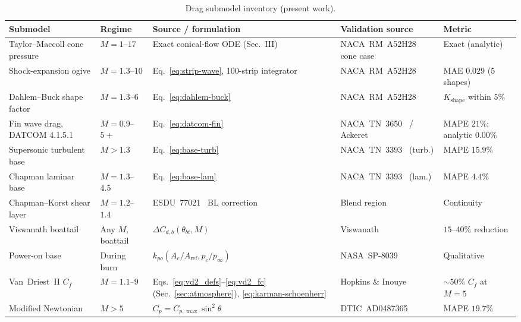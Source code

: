 \begin{table}[htbp]
\centering
\caption{Drag submodel inventory (present work).}
\label{tab:drag-inventory}
\begingroup\footnotesize
\begin{tabularx}{\textwidth}{@{}l l X X l@{}}
\toprule
Submodel & Regime & Source / formulation & Validation source & Metric \\
\midrule
Taylor--Maccoll cone pressure & $M = 1$--$17$ & Exact conical-flow ODE (Sec.~III)
   & NACA~RM~A52H28 cone case & Exact (analytic) \\
Shock-expansion ogive & $M = 1.3$--$10$ & Eq.~\eqref{eq:strip-wave}, 100-strip integrator
   & NACA~RM~A52H28~\cite{a52h28} & MAE $0.029$ (5 shapes) \\
Dahlem--Buck shape factor & $M = 1.3$--$6$ & Eq.~\eqref{eq:dahlem-buck}
   & NACA~RM~A52H28~\cite{a52h28} & $K_{\mathrm{shape}}$ within $5\%$ \\
Fin wave drag, DATCOM 4.1.5.1 & $M = 0.9$--$5{+}$ & Eq.~\eqref{eq:datcom-fin}
   & NACA~TN~3650~\cite{ulmann1956} / Ackeret & MAPE $21\%$; analytic $0.00\%$ \\
Supersonic turbulent base & $M > 1.3$ & Eq.~\eqref{eq:base-turb}
   & NACA~TN~3393~\cite{chapman1955} (turb.) & MAPE $15.9\%$ \\
Chapman laminar base & $M = 1.3$--$4.5$ & Eq.~\eqref{eq:base-lam}
   & NACA~TN~3393~\cite{chapman1955} (lam.) & MAPE $4.4\%$ \\
Chapman--Korst shear layer & $M = 1.2$--$1.4$ & ESDU~77021~\cite{esdu77021} BL correction
   & Blend region & Continuity \\
Viswanath boattail & Any $M$, boattail & $\Delta C_{d,b}(\theta_{bt}, M)$
   & Viswanath~\cite{viswanath1996} & $15$--$40\%$ reduction \\
Power-on base & During burn & $k_{po}(A_e/A_{\mathrm{ref}}, p_e/p_\infty)$
   & NASA~SP-8039~\cite{nasa_sp8039} & Qualitative \\
Van~Driest~II $C_f$ & $M = 1.1$--$9$ & Eqs.~\eqref{eq:vd2_defs}--\eqref{eq:vd2_fc} (Sec.~\ref{sec:atmosphere}), \eqref{eq:karman-schoenherr}
   & Hopkins \& Inouye~\cite{hopkins1971} & ${\sim}50\%$ $C_f$ at $M = 5$ \\
Modified Newtonian & $M > 5$ & $C_p = C_{p,\max}\sin^2\theta$
   & DTIC~AD0487365~\cite{grabow1965} & MAPE $19.7\%$ \\
\bottomrule
\end{tabularx}
\endgroup
\end{table}
